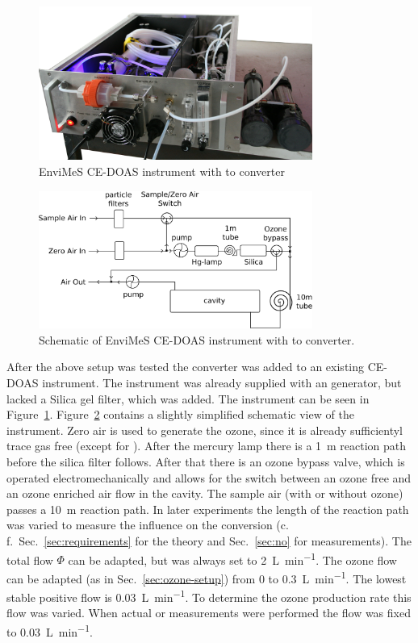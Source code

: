 \begin{figure}[htbp]
  \centering
  \includegraphics[width=0.8\textwidth]{images/InstrumentEdited_small.jpg}
  \caption{EnviMeS CE-DOAS instrument with  to 
    converter}
  \label{fig:envimes}
\end{figure}

\begin{figure}[htbp]
  \centering
  \includegraphics[width=0.8\textwidth]{images/envimes_setup.eps}
  \caption{Schematic of EnviMeS CE-DOAS instrument with  to
     converter.}
  \label{fig:envimes-schematic}
\end{figure}

After the above setup was tested the converter was added to an
existing CE-DOAS instrument. The instrument was already supplied with
an  generator, but lacked a Silica gel filter, which was
added. The instrument can be seen in
Figure~\ref{fig:envimes}. Figure~\ref{fig:envimes-schematic} contains
a slightly simplified schematic view of the instrument. Zero air is
used to generate the ozone, since it is already sufficientyl trace gas
free (except for ). After the mercury lamp there is a
\SI{1}{\meter} reaction path before the silica filter follows. After
that there is an ozone bypass valve, which is operated
electromechanically and allows for the switch between an ozone free and
an ozone enriched air flow in the cavity. The sample air (with or
without ozone) passes a \SI{10}{\meter} reaction path. In later
experiments the length of the reaction path was varied to measure the
influence on the  conversion (c.\,f.\
Sec.~\ref{sec:requirements} for the theory and Sec.~\ref{sec:no} for
measurements). The total flow $\Phi$ can be adapted, but was always
set to \SI{2}{\liter\per\minute}. The ozone flow can be adapted (as
in Sec.~\ref{sec:ozone-setup}) from 0 to
\SI{0.3}{\liter\per\minute}. The lowest stable positive flow is
\SI{0.03}{\liter\per\minute}. To determine the ozone production rate
this flow was varied. When actual \ch{NO} or \ch{NO_x} measurements
were performed the flow was fixed to \SI{0.03}{\liter\per\minute}.

